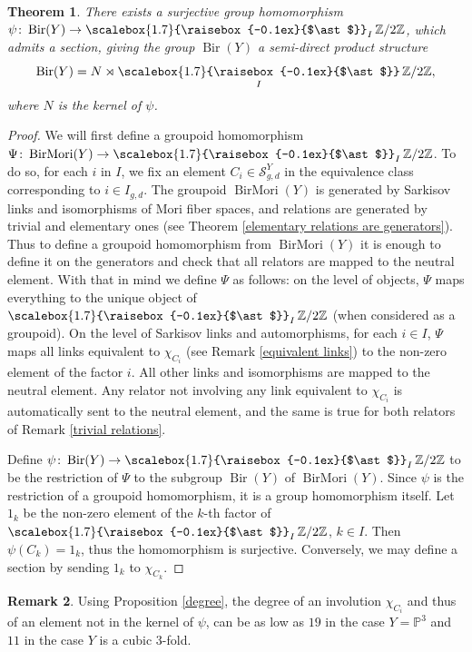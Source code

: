 \documentclass[JEP,XML,SOM,Unicode,published]{cedram}
\theoremstyle{plain}
\newtheorem{theorem}{Theorem}[section]
\theoremstyle{definition}
\newtheorem{remark}[theorem]{Remark}
\newcommand\Bir{\operatorname{Bir}}
\newcommand\BirMori{\operatorname{BirMori}}
\newcommand{\ZZ}{\mathbb{Z}}
\newcommand{\PP}{\mathbb{P}}
\newcommand{\freeprod}{\mathop{\scalebox{1.7}{\raisebox{-0.1ex}{$\ast$}}}}
\begin{document}
\begin{theorem}
There exists a surjective group homomorphism $\psi \colon \Bir(Y) \to \freeprod_I \ZZ/2\ZZ$, which admits a section, giving the group $\Bir(Y)$ a semi-direct product structure
\[
\Bir(Y ) = N \rtimes \freeprod_I \ZZ/2\ZZ,
\]
where $N$ is the kernel of $\psi$.
\end{theorem}

\begin{proof}
We will first define a groupoid homomorphism $\Psi\colon \BirMori(Y) \to \freeprod_I \ZZ/2\ZZ$. To do so, for each $i$ in $I$, we fix an element $C_i \in \mathcal{S}_{g,d}^Y$ in the equivalence class corresponding to $i \in I_{g,d}$.
The groupoid $\BirMori(Y)$ is generated by Sarkisov links and isomorphisms of Mori fiber spaces, and relations are generated by trivial and elementary ones (see Theorem \ref{elementary relations are generators}). Thus to define a groupoid homomorphism from $\BirMori(Y)$ it is enough to define it on the generators and check that all relators are mapped to the neutral element.
With that in mind we define $\Psi$ as follows:
on the level of objects, $\Psi$ maps everything to the unique object of $\freeprod_I \ZZ/2\ZZ$ (when considered as a groupoid).
On the level of Sarkisov links and automorphisms, for each $i \in I$, $\Psi$ maps all links equivalent to $\chi_{C_i}$ (see Remark \ref{equivalent links}) to the non-zero element of the factor $i$.
All other links and isomorphisms are mapped to the neutral element.
Any relator not involving any link equivalent to $\chi_{C_i}$ is automatically sent to the neutral element, and the same is true for both relators of Remark \ref{trivial relations}.

Define $\psi\colon \Bir(Y) \to \freeprod_I \ZZ/2\ZZ$ to be the restriction of $\Psi$ to the subgroup $\Bir(Y)$ of $\BirMori(Y)$. Since $\psi$ is the restriction of a groupoid homomorphism, it is a group homomorphism itself.
Let $1_k$ be the non-zero element of the $k$-th factor of $\freeprod_I \ZZ/2\ZZ$, $k\in I$. Then $\psi(C_k) = 1_k$, thus the homomorphism is surjective. Conversely, we may define a section by sending $1_k$ to $\chi_{C_k}$.
\end{proof}

\begin{remark}
Using Proposition \ref{degree}, the degree of an involution $\chi_{C_i}$ and thus of an element not in the kernel of $\psi$, can be as low as $19$ in the case $Y = \PP^3$ and $11$ in the case $Y$ is a cubic $3$-fold.
\end{remark}
\end{document}
